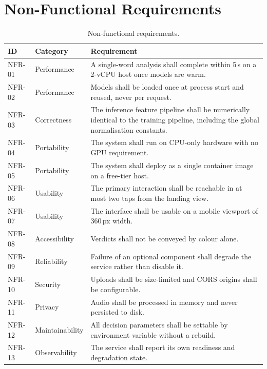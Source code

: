 \section{Non-Functional Requirements}
\label{sec:nfr}

\begin{table}[H]
\centering
\caption[Non-functional requirements]{Non-functional requirements.}
\label{tab:nfr}
\small
\begin{tabularx}{\textwidth}{@{}p{1.2cm}p{2.5cm}X@{}}
\toprule
\textbf{ID} & \textbf{Category} & \textbf{Requirement} \\
\midrule
NFR-01 & Performance & A single-word analysis shall complete within 5\,s on a 2-vCPU host once models are warm. \\
NFR-02 & Performance & Models shall be loaded once at process start and reused, never per request. \\
NFR-03 & Correctness & The inference feature pipeline shall be numerically identical to the training pipeline, including the global normalisation constants. \\
NFR-04 & Portability & The system shall run on CPU-only hardware with no GPU requirement. \\
NFR-05 & Portability & The system shall deploy as a single container image on a free-tier host. \\
NFR-06 & Usability & The primary interaction shall be reachable in at most two taps from the landing view. \\
NFR-07 & Usability & The interface shall be usable on a mobile viewport of 360\,px width. \\
NFR-08 & Accessibility & Verdicts shall not be conveyed by colour alone. \\
NFR-09 & Reliability & Failure of an optional component shall degrade the service rather than disable it. \\
NFR-10 & Security & Uploads shall be size-limited and CORS origins shall be configurable. \\
NFR-11 & Privacy & Audio shall be processed in memory and never persisted to disk. \\
NFR-12 & Maintainability & All decision parameters shall be settable by environment variable without a rebuild. \\
NFR-13 & Observability & The service shall report its own readiness and degradation state. \\
\bottomrule
\end{tabularx}
\end{table}

